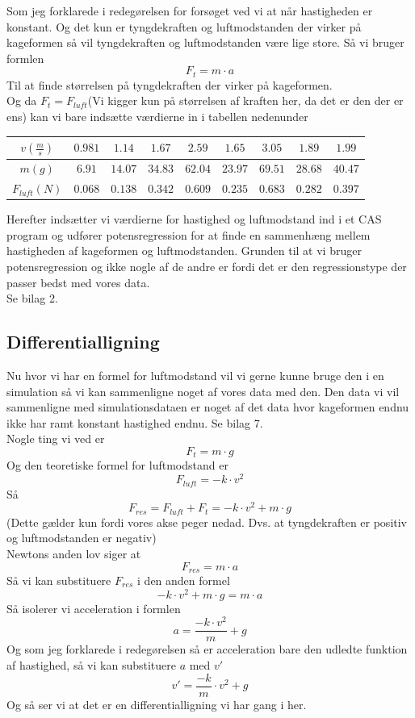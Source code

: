 \documentclass[12pt]{article}
\begin{document}
Som jeg forklarede i redegørelsen for forsøget ved vi at når hastigheden er konstant. Og det kun er tyngdekraften og luftmodstanden der virker på kageformen
så vil tyngdekraften og luftmodstanden være lige store. Så vi bruger formlen
$$F_{t}=m \cdot a$$
Til at finde størrelsen på tyngdekraften der virker på kageformen. \\
Og da $F_{t}=F_{luft}$(Vi kigger kun på størrelsen af kraften her, da det er den der er ens)
kan vi bare indsætte værdierne in i tabellen nedenunder
\begin{center}
  \begin{tabular}{| c | c | c | c | c | c | c | c | c |}
        \hline
        $v(\frac{m}{s})$ & $0.981$ & $1.14$ & $1.67$ & $2.59$ & $1.65$ & $3.05$ & $1.89$ & $1.99$ \\
        \hline
        $m(g)$ & $6.91$ & $14.07$ & $34.83$ & $62.04$ & $23.97$ & $69.51$ & $28.68$ & $40.47$ \\
        \hline
        $F_{luft}(N)$ & $0.068$ & $0.138$ & $0.342$ & $0.609$ & $0.235$ & $0.683$ & $0.282$ & $0.397$ \\
        \hline
  \end{tabular}
\end{center}

Herefter indsætter vi værdierne for hastighed og luftmodstand ind i et CAS program og udfører potensregression for at finde en sammenhæng mellem
hastigheden af kageformen og luftmodstanden. Grunden til at vi bruger potensregression og ikke nogle af de andre er fordi det er den regressionstype der passer bedst med vores data.\\
Se bilag 2.
\subsection{Differentialligning}
Nu hvor vi har en formel for luftmodstand vil vi gerne kunne bruge den i en simulation så vi kan sammenligne noget af vores data med den. Den data
vi vil sammenligne med simulationsdataen er noget af det data hvor kageformen endnu ikke har ramt konstant hastighed endnu. Se bilag 7.\\
Nogle ting vi ved er
$$F_{t}=m \cdot g$$
Og den teoretiske formel for luftmodstand er
$$F_{luft}=-k \cdot v^2$$
Så
$$F_{res}=F_{luft}+F_{t}=-k \cdot v^2 + m \cdot g$$
(Dette gælder kun fordi vores akse peger nedad. Dvs. at tyngdekraften er positiv og luftmodstanden er negativ)\\
Newtons anden lov siger at
$$F_{res}=m \cdot a$$
Så vi kan substituere $F_{res}$ i den anden formel
$$-k \cdot v^2 + m \cdot g = m \cdot a$$
Så isolerer vi acceleration i formlen
$$a = \frac{-k \cdot v^2}{m} + g$$
Og som jeg forklarede i redegørelsen så er acceleration bare den udledte funktion af hastighed, så vi kan substituere
$a$ med $v'$
$$v'=\frac{-k}{m}\cdot v^2 + g$$
Og så ser vi at det er en differentialligning vi har gang i her.
\end{document}
